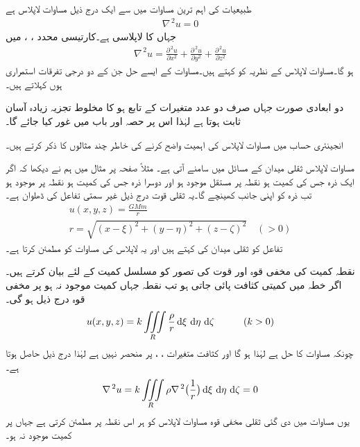 طبیعیات کی اہم ترین مساوات میں سے ایک درج ذیل مساوات لاپلاس  ہے
\begin{align}\label{مساوات_جزوی_لاپلاس_الف}
\nabla^{\,2}u=0
\end{align}
جہاں  کا لاپلاسی    ہے۔کارتیسی محدد ، ،  میں
\begin{align}\label{مساوات_جزوی_لاپلاس_ب}
\nabla^{\,2}u=\frac{\partial^{\,2}u}{\partial x^2}+\frac{\partial^{\,2}u}{\partial y^2}+\frac{\partial^{\,2}u}{\partial z^2}
\end{align}
ہو گا۔مساوات لاپلاس کے نظریہ کو  کہتے ہیں۔مساوات  کے ایسے حل جن کے دو درجی تفرقات استمراری ہوں  کہلاتے ہیں۔

دو ابعادی صورت جہاں  صرف دو عدد متغیرات کے تابع ہو کا مخلوط تجزیہ زیادہ آسان ثابت ہوتا ہے لہٰذا اس پر حصہ  اور  باب  میں غور کیا جائے گا۔

انجینئری حساب میں مساوات لاپلاس کی اہمیت واضح کرنے کی خاطر چند مثالوں کا ذکر کرتے ہیں۔

مساوات لاپلاس ثقلی میدان کے مسائل میں سامنے آتی ہے۔  مثلاً صفحہ  پر مثال  میں ہم نے دیکھا کہ اگر ایک ذرہ  جس کی کمیت  ہو نقطہ  پر مستقل موجود ہو اور دوسرا ذرہ  جس کی کمیت  ہو نقطہ  پر موجود ہو تب  ذرہ  کو اپنی جانب کھینچے گا۔یہ ثقلی قوت درج ذیل غیر سمتی تفاعل  کی ڈھلوان ہے۔
\begin{align*}
u(x,y,z)=\frac{GMm}{r}\\
r=\sqrt{(x-\xi)^2+(y-\eta)^2+(z-\zeta)^2}\quad (>0)
\end{align*}
تفاعل  کو ثقلی میدان کی  کہتے ہیں اور یہ لاپلاس کی مساوات کو مطمئن کرتا ہے۔ 

نقطہ کمیت کی مخفی قوہ اور قوت کی تصور کو مسلسل کمیت کے لئے بیان کرتے ہیں۔اگر خطہ  میں کمیتی کثافت  پائی جاتی ہو تب  نقطہ  جہاں کمیت موجود نہ ہو  پر مخفی قوہ  درج ذیل ہو گی۔ 
\begin{align}\label{مساوات_جزوی_لاپلاس_پ}
u(x,y,z)=k\iiint\limits_R \frac{\rho}{r}\dif \xi\,\dif \eta\,\dif \zeta\quad \quad \quad (k>0)
\end{align}
چونکہ  مساوات  کا حل ہے لہٰذا  ہو گا اور کثافت   متغیرات ، ،  پر منحصر نہیں ہے لہٰذا درج ذیل حاصل ہوتا ہے۔
\begin{align*}
\nabla^{\,2}u=k\iiint\limits_R \rho\nabla^{\,2}\big(\frac{1}{r}\big) \dif \xi\,\dif \eta\,\dif \zeta=0
\end{align*}
یوں مساوات  میں دی گئی ثقلی مخفی قوہ مساوات لاپلاس کو ہر اس نقطہ پر مطمئن کرتی ہے جہاں پر کمیت موجود نہ ہو۔

